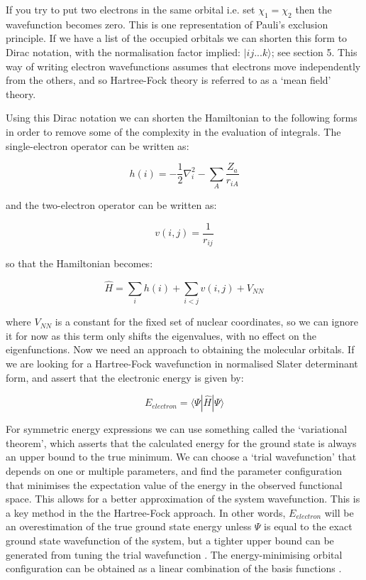 \documentclass[10pt]{article}
\begin{document}
If you try to put two electrons in the same orbital i.e. set $\chi_1 = \chi_2$ then the wavefunction becomes zero. This is one representation of Pauli's exclusion principle. If we have a list of the occupied orbitals we can shorten this form to Dirac notation, with the normalisation factor implied: $|ij...k\rangle$; see section 5. This way of writing electron wavefunctions assumes that electrons move independently from the others, and so Hartree-Fock theory is referred to as a `mean field' theory. 

Using this Dirac notation we can shorten the Hamiltonian to the following forms in order to remove some of the complexity in the evaluation of integrals. The single-electron operator can be written as:

\begin{equation*}
	h(i) = -\frac{1}{2}\nabla_i^2-\sum_A\frac{Z_a}{r_{iA}}
\end{equation*}

and the two-electron operator can be written as:

\begin{equation*}
	v(i,j)=\frac{1}{r_{ij}}
\end{equation*}

so that the Hamiltonian becomes:

\begin{equation*}
	\hat{H} = \sum_i h(i) + \sum_{i<j}v(i,j) + V_{NN}
\end{equation*}

where $V_{NN}$ is a constant for the fixed set of nuclear coordinates, so we can ignore it for now as this term only shifts the eigenvalues, with no effect on the eigenfunctions. Now we need an approach to obtaining the molecular orbitals. If we are looking for a Hartree-Fock wavefunction in normalised Slater determinant form, and assert that the electronic energy is given by:

\begin{equation*}
	E_{electron} = \langle\Psi|\hat{H}|\Psi\rangle
\end{equation*}

For symmetric energy expressions we can use something called the `variational theorem', which asserts that the calculated energy for the ground state is always an upper bound to the true minimum. We can choose a `trial wavefunction' that depends on one or multiple parameters, and find the parameter configuration that minimises the expectation value of the energy in the observed functional space. This allows for a better approximation of the system wavefunction. This is a key method in the the Hartree-Fock approach. In other words, $E_{electron}$ will be an overestimation of the true ground state energy unless $\Psi$ is equal to the exact ground state wavefunction of the system, but a tighter upper bound can be generated from tuning the trial wavefunction \cite{sakurai1994modern}.  The energy-minimising orbital configuration can be obtained as a linear combination of the basis functions \cite{sherrill2000introduction}. 
\end{document}
